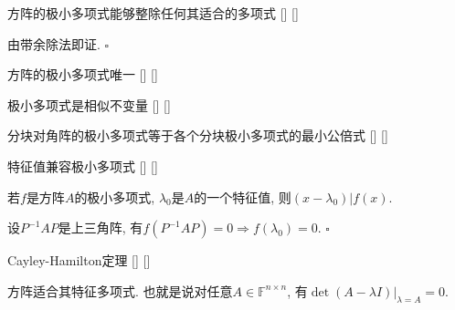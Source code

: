 \documentclass[UTF8]{ctexart}
\begin{document}
		\begin{ppt}
			[]
			{方阵的极小多项式能够整除任何其适合的多项式}
			[]
			[]

		\end{ppt}

		\begin{prf}
			由带余除法即证. $\square$
		\end{prf}

		\begin{ppt}
			[]
			{方阵的极小多项式唯一}
			[]
			[]

		\end{ppt}
		
		\begin{ppt}
			[]
			{极小多项式是相似不变量}
			[]
			[]

		\end{ppt}
		
		\begin{ppt}
			[]
			{分块对角阵的极小多项式等于各个分块极小多项式的最小公倍式}
			[]
			[]

		\end{ppt}
		
		\begin{ppt}
			[]
			{特征值兼容极小多项式}
			[]
			[]

			若$f$是方阵$A$的极小多项式, $\lambda_0$是$A$的一个特征值, 则$(x-\lambda_0)|f(x)$. 
		\end{ppt}

		\begin{prf}
			设$P^{-1}AP$是上三角阵, 有$f(P^{-1}AP)=0\Longrightarrow f(\lambda_0)=0$. $\square$
		\end{prf}
		
		\begin{thm}
			[]
			{Cayley-Hamilton定理}
			[]
			[]

			方阵适合其特征多项式. 也就是说对任意$A\in\mathbb{F}^{n\times n}$, 有$\det(A-\lambda I)|_{\lambda=A}=0$.
		\end{thm}
\end{document}
